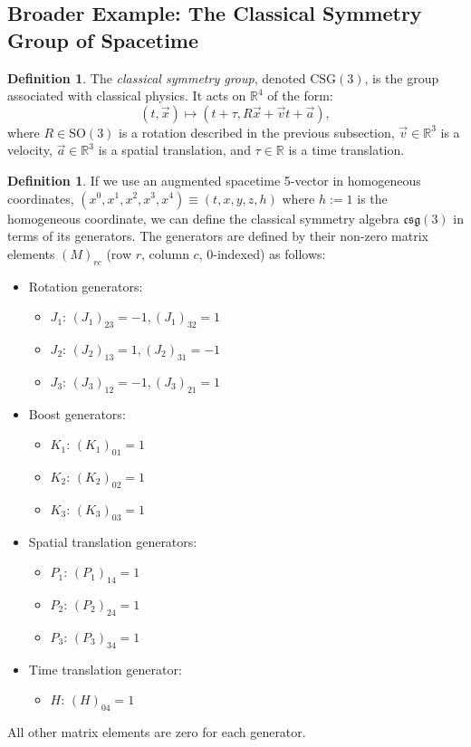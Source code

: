 \documentclass{amsart}
\theoremstyle{definition}
\newtheorem{definition}[theorem]{Definition}
\theoremstyle{remark}
\begin{document}
\subsection{Broader Example: The Classical Symmetry Group of Spacetime}
\label{subsec:csg}
\begin{definition}
  The \emph{classical symmetry group}, denoted $\mathrm{CSG}(3)$, is the group associated with classical physics. It acts on $\mathbb{R}^4$ of the form:
  \begin{equation*}
    (t, \vec{x}) \mapsto (t + \tau, R \vec{x} + \vec{v} t + \vec{a}),
  \end{equation*}
  where $R \in \mathrm{SO}(3)$ is a rotation described in the previous subsection, $\vec{v} \in \mathbb{R}^3$ is a velocity, $\vec{a} \in \mathbb{R}^3$ is a spatial translation, and $\tau \in \mathbb{R}$ is a time translation.
\end{definition}
\begin{definition}
  If we use an augmented spacetime 5-vector in homogeneous coordinates, $(x^0, x^1, x^2, x^3, x^4) \equiv (t,x,y,z,h)$ where $h:=1$ is the homogeneous coordinate, we can define the classical symmetry algebra $\mathfrak{csg}(3)$ in terms of its generators. The generators are defined by their non-zero matrix elements $(M)_{rc}$ (row $r$, column $c$, 0-indexed) as follows:
    \begin{itemize}
        \item Rotation generators:
        \begin{itemize}
            \item $J_1$: $(J_1)_{23} = -1, (J_1)_{32} = 1$
            \item $J_2$: $(J_2)_{13} = 1, (J_2)_{31} = -1$
            \item $J_3$: $(J_3)_{12} = -1, (J_3)_{21} = 1$
        \end{itemize}
        \item Boost generators:
        \begin{itemize}
            \item $K_1$: $(K_1)_{01} = 1$
            \item $K_2$: $(K_2)_{02} = 1$
            \item $K_3$: $(K_3)_{03} = 1$
        \end{itemize}
        \item Spatial translation generators:
        \begin{itemize}
            \item $P_1$: $(P_1)_{14} = 1$
            \item $P_2$: $(P_2)_{24} = 1$
            \item $P_3$: $(P_3)_{34} = 1$
        \end{itemize}
        \item Time translation generator:
        \begin{itemize}
            \item $H$: $(H)_{04} = 1$
        \end{itemize}
    \end{itemize}
    All other matrix elements are zero for each generator.
\end{definition}
\end{document}
